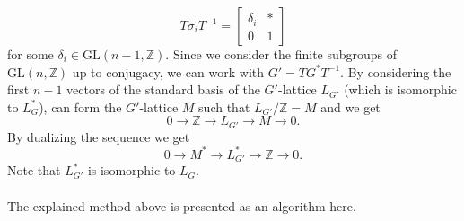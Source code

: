 \documentclass{article}
\theoremstyle{plain}
\theoremstyle{definition}
\newcommand{\Z}{\ensuremath{\mathbb{Z}}}
\begin{document}
$$T \sigma_i T^{-1} = \left[ \begin{array}{c|c}
\delta_i & \ast\\
\hline 0 & 1
\end{array} \right]
$$ 
for some $\delta_i \in \mathrm{GL}(n-1,\Z).$ Since we consider the finite subgroups of $\mathrm{GL}(n,\Z)$ up to conjugacy, we can work with $G' = TG^*T^{-1}$. By considering the first $n-1$ vectors of the standard basis of the $G'$-lattice $L_{G'}$ (which is isomorphic to $L^*_G$), can form the $G'$-lattice $M$ such that $L_{G'}/\Z = M$ and we get 
$$0 \longrightarrow \Z \longrightarrow L_{G'} \longrightarrow M \longrightarrow 0.$$
By dualizing the sequence we get  $$0 \longrightarrow M^* \longrightarrow L^*_{G'} \longrightarrow \Z \longrightarrow 0.$$
Note that $L^*_{G'}$ is isomorphic to $L_G$.\\
\\
The explained method above is presented as an algorithm here.
\end{document}
